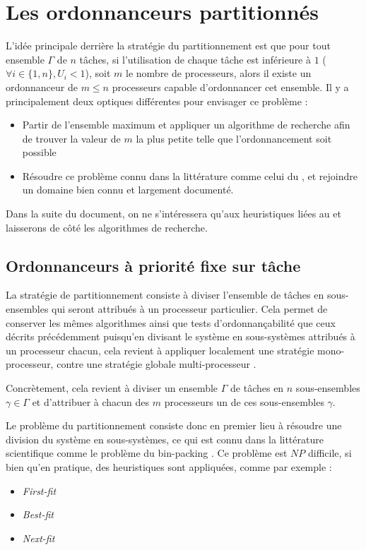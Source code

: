 	\section{Les ordonnanceurs partitionnés}
	L'idée principale derrière la stratégie du partitionnement est que pour tout 
	ensemble $\Gamma$ de $n$ tâches, si l'utilisation de chaque tâche est inférieure à $1$ 
	($\forall i \in \{1, n\}, U_i < 1$), soit $m$ le nombre de processeurs,  
	alors il existe un ordonnanceur de $m \leq n$ processeurs capable d'ordonnancer cet ensemble. 
	Il y a principalement deux optiques différentes pour envisager ce problème : \medskip
	\begin{itemize}
		\item Partir de l'ensemble maximum et appliquer un algorithme de recherche afin de trouver 
		la valeur de $m$ la plus petite telle que l'ordonnancement soit possible
		\item Résoudre ce problème connu dans la littérature comme celui du , 
		et rejoindre un domaine bien connu et largement documenté.
	\end{itemize}
	Dans la suite du document, on ne s'intéressera qu'aux heuristiques liées au  et 
	laisserons de côté les algorithmes de recherche.
	
	\subsection{Ordonnanceurs à priorité fixe sur tâche}
	
	La stratégie de partitionnement consiste à diviser l'ensemble de tâches en sous-ensembles qui seront 
	attribués à un processeur particulier. Cela permet de conserver les mêmes algorithmes ainsi 
	que tests d'ordonnançabilité que ceux 
	décrits précédemment puisqu'en divisant le système en sous-systèmes attribués à un 
	processeur chacun, cela revient à appliquer \og localement\fg{}  une stratégie mono-processeur, contre 
	une stratégie globale multi-processeur \cite{ndoye_ordonnancement_2014}.
	
	Concrètement, cela revient à diviser un ensemble $\Gamma$ de tâches en $n$ sous-ensembles 
	$\gamma \in \Gamma$ et d'attribuer à chacun des $m$ processeurs un de ces sous-ensembles $\gamma$.\newline
	
	
	Le problème du partitionnement consiste donc en premier lieu 
	à résoudre une division du système en sous-systèmes, ce qui est connu dans la 
	littérature scientifique comme le problème du bin-packing \cite{ausiello_approximation_1984}.
	Ce problème est $NP$ difficile, si bien qu'en pratique, 
	des heuristiques sont appliquées, comme par exemple :\medskip
	\begin{itemize}
		\item \textit{First-fit} 
		\item \textit{Best-fit}
		\item \textit{Next-fit}
	\end{itemize}
	
